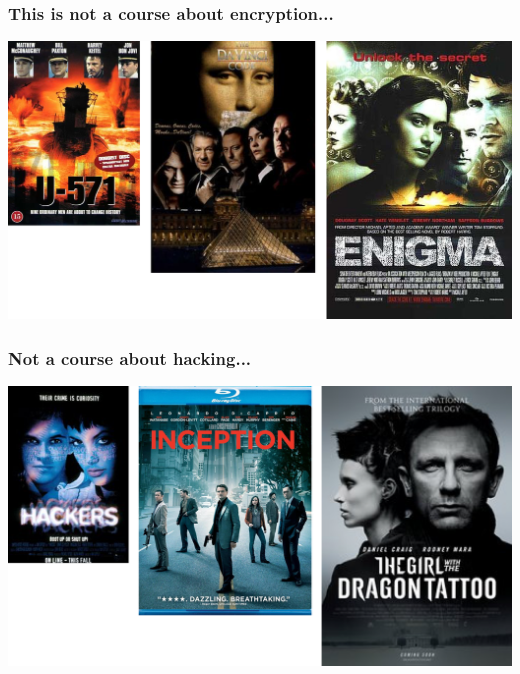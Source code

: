 \documentclass[10pt]{beamer}
\begin{document}
\begin{frame}

\frametitle{This is not a course about encryption...}

\hspace*{-1.5em}
\includegraphics[width=1.1\textwidth]{crypto.png}

\end{frame}


\begin{frame}

\frametitle{Not a course about hacking...}

\hspace*{-1.5em}
\includegraphics[width=1.1\textwidth]{hacking.png}

\end{frame}

\end{document}
